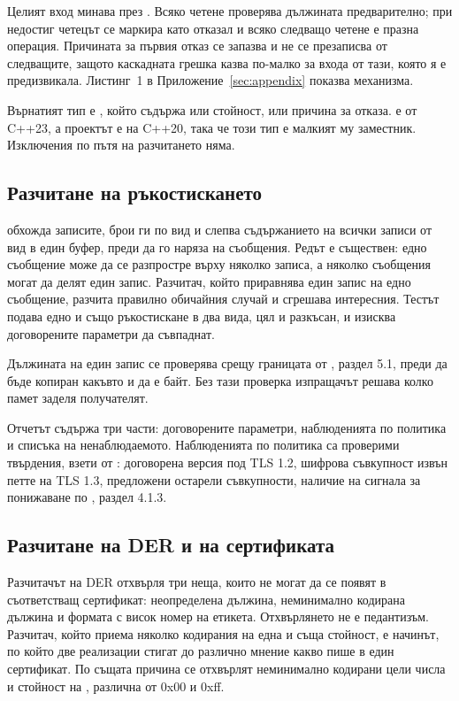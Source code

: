 Целият вход минава през . Всяко четене проверява дължината
предварително; при недостиг четецът се маркира като отказал и всяко следващо четене е празна
операция. Причината за първия отказ се запазва и не се презаписва от следващите, защото
каскадната грешка казва по-малко за входа от тази, която я е предизвикала. Листинг~1 в
Приложение~\ref{sec:appendix} показва механизма.

Върнатият тип е , който съдържа или стойност, или причина за отказа.
 е от C++23, а проектът е на C++20, така че този тип е малкият му
заместник. Изключения по пътя на разчитането няма.

\subsection{Разчитане на ръкостискането}
\label{subsec:impl_parser}

 обхожда записите, брои ги по вид и слепва съдържанието на всички
записи от вид  в един буфер, преди да го наряза на съобщения. Редът е
съществен: едно съобщение може да се разпростре върху няколко записа, а няколко съобщения
могат да делят един запис. Разчитач, който приравнява един запис на едно съобщение,
разчита правилно обичайния случай и сгрешава интересния. Тестът
 подава едно и
също ръкостискане в два вида, цял и разкъсан, и изисква договорените параметри да съвпаднат.

Дължината на един запис се проверява срещу границата от \cite{rfc8446}, раздел 5.1, преди
да бъде копиран какъвто и да е байт. Без тази проверка изпращачът решава колко памет заделя
получателят.

Отчетът съдържа три части: договорените параметри, наблюденията по политика и списъка на
ненаблюдаемото. Наблюденията по политика са проверими твърдения, взети от
\cite{nist80052r2}: договорена версия под TLS 1.2, шифрова съвкупност извън петте на
TLS 1.3, предложени остарели съвкупности, наличие на сигнала за понижаване по
\cite{rfc8446}, раздел 4.1.3.

\subsection{Разчитане на DER и на сертификата}
\label{subsec:impl_der}

Разчитачът на DER отхвърля три неща, които не могат да се появят в съответстващ сертификат:
неопределена дължина, неминимално кодирана дължина и формата с висок номер на етикета.
Отхвърлянето не е педантизъм. Разчитач, който приема няколко кодирания на една и съща
стойност, е начинът, по който две реализации стигат до различно мнение какво пише в един
сертификат. По същата причина се отхвърлят неминимално кодирани цели числа и стойност на
, различна от 0x00 и 0xff.

